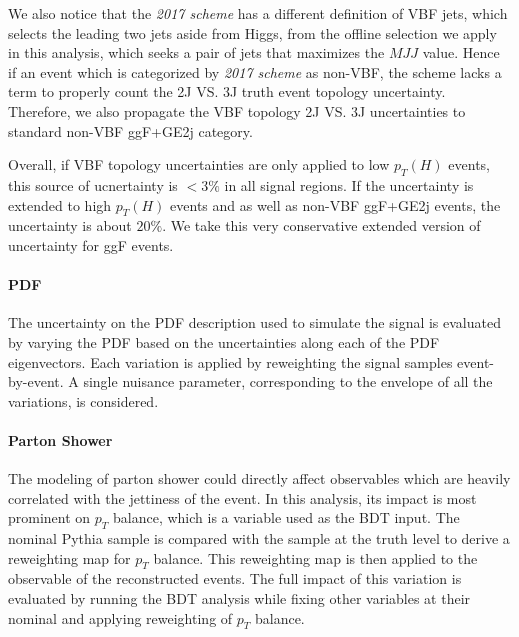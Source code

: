 We also notice that the \textit{2017 scheme} has a different definition of VBF jets, which selects the leading two jets aside from Higgs,  from the 
offline selection we apply in this analysis, which seeks a pair of jets that maximizes the $MJJ$ value. Hence if an event which is categorized by \textit{2017 scheme}
as non-VBF, the scheme lacks a term to properly count the 2J VS. 3J truth event topology uncertainty. Therefore, we also propagate the VBF topology 2J VS. 3J
uncertainties to standard non-VBF ggF+GE2j category. 

Overall, if VBF topology uncertainties are only applied to low $p_T(H)$ events, this source 
of ucnertainty is $<3\%$ in all signal regions. If the uncertainty is extended to high $p_T(H)$ events and as well as non-VBF ggF+GE2j events, the uncertainty
is about $20\%$. We take this very conservative extended version of uncertainty for ggF events.



\paragraph{PDF}
The uncertainty on the PDF description used to simulate the signal is evaluated
by varying the PDF based on the uncertainties along each of the PDF eigenvectors.
Each variation is applied by reweighting the signal samples event-by-event.
A single nuisance parameter, corresponding to the envelope of all the variations,
is considered.

\paragraph{Parton Shower}

The modeling of parton shower could directly affect observables which are heavily 
correlated with the jettiness of the event. In this analysis, its impact is most 
prominent on $p_{T}$ balance, which is a variable used as the BDT input. The nominal
Pythia sample is compared with the \herwig{} sample at the truth level to derive a 
reweighting map for $p_{T}$ balance.
This reweighting map is then applied to the observable of the reconstructed events. The full impact of this variation 
is evaluated by running the BDT analysis while fixing other variables at their nominal 
and applying reweighting of $p_{T}$ balance. 


